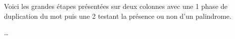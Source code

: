 Voici les grandes étapes présentées sur deux colonnes avec une 1\iere{} phase de duplication du mot puis une 2\ieme{} testant la présence ou non d'un palindrome.


\begin{multicols}{2}


\phantom{\emptybox\emptybox}%
	\deah

\emptybox\emptybox%
\emptybox\emptybox

\emptybox\emptybox%
	\emptybox\emptybox\emptybox\emptybox\emptybox%
\emptybox\emptybox

\phantom{\emptybox\emptybox}%
	\head


\medskip %

\phantom{\emptybox\emptybox\emptybox}%
	\deah

\emptybox\emptybox%
\emptybox\emptybox

\emptybox\emptybox%
	\emptybox\emptybox\emptybox\emptybox%
\emptybox\emptybox

\phantom{\emptybox\emptybox\emptybox}%
	\head


\medskip %

\phantom{\emptybox\emptybox\emptybox\emptybox}%
	\deah

\emptybox\emptybox%
\emptybox\emptybox

\emptybox\emptybox%
	\emptybox\emptybox\emptybox%
\emptybox\emptybox

\phantom{\emptybox\emptybox\emptybox\emptybox}%
	\head


\bigskip %

\dots

\bigskip %

\phantom{\emptybox\emptybox\emptybox\emptybox\emptybox\emptybox\emptybox}%
	\deah

\emptybox\emptybox%
\emptybox\emptybox

\emptybox\emptybox%
\emptybox\emptybox

\phantom{\emptybox\emptybox\emptybox\emptybox\emptybox\emptybox\emptybox}%
	\head


\vfill\null
\columnbreak  %

\phantom{\emptybox}%
	\deah

\emptybox\emptybox%
\emptybox\emptybox


\end{multicols}
